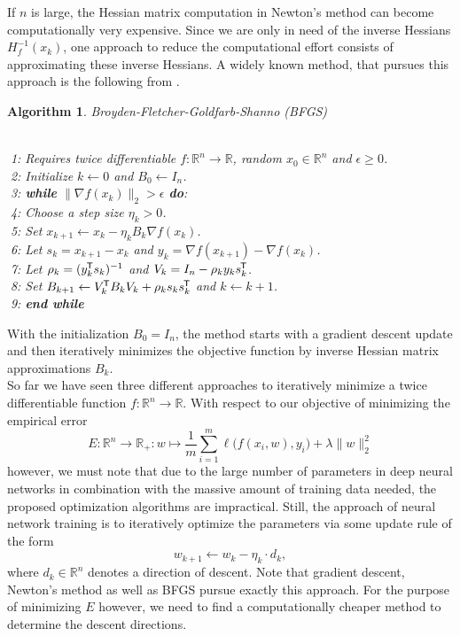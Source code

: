 \documentclass[11pt, a4paper]{article}
\newtheorem{algorithm}[theorem]{Algorithm}
\newcommand{\R}{\mathbb{R}}
\newcommand*{\tr}{^{\mkern-1.5mu\mathsf{T}}}
\begin{document}
If $n$ is large, the Hessian matrix computation in Newton's method can become computationally very expensive. Since we are only in need of the inverse Hessians $H_f^{-1}(x_k)$, one approach to reduce the computational effort consists of approximating these inverse Hessians. A widely known method, that pursues this approach is the following from \cite{BFGS}.

\begin{algorithm}
\caption{Broyden-Fletcher-Goldfarb-Shanno (BFGS) \textcolor{white}{$\Big |$}} \ \\
\textcolor{white}{$\Big |$}1: Requires twice differentiable $f: \R^n \to \R$, random $x_0 \in \R^n$ and  $\epsilon \geq 0$. \\
\textcolor{white}{$\Big |$}2: Initialize $k \leftarrow 0$ and $B_0 \leftarrow I_n$. \\
\textcolor{white}{$\Big |$}3: \textbf{while} $ \big \| \nabla f(x_k) \big \|_2 > \epsilon $ \textbf{do}: \\
\textcolor{white}{$\Big |$}4: \quad Choose a step size $\eta_k > 0$. \\
\textcolor{white}{$\Big |$}5: \quad Set $x_{k+1} \leftarrow x_k - \eta_k B_k \nabla f(x_{k})$. \\
\textcolor{white}{$\Big |$}6: \quad Let $s_k = x_{k+1} - x_{k}$ and $y_k = \nabla f(x_{k+1}) - \nabla f(x_{k})$. \\
\textcolor{white}{$\Big |$}7: \quad Let $\rho_k = (y_k\tr s_k)^{-1}$ and $V_k = I_n - \rho_k y_k s_k\tr $. \\
\textcolor{white}{$\Big |$}8: \quad Set $B_{k+1} \leftarrow V_k\tr B_{k}V_k + \rho_k s_k s_k\tr $ and $k \leftarrow k+1$. \\
\textcolor{white}{$\Big |$}9: \textbf{end while}
\end{algorithm}

With the initialization $B_0 = I_n$, the method starts with a gradient descent update and then iteratively minimizes the objective function by inverse Hessian matrix approximations $B_k$. \\

So far we have seen three different approaches to iteratively minimize a twice differentiable function $f: \R^n \to \R$. With respect to our objective of minimizing the empirical error
\[ E : \R^n \to \R_+ : w \mapsto \frac{1}{m} \sum_{i=1}^{m} \ell \big ( f(x_i,w),y_i \big) + \lambda \big \| w \big \|_2^2 \]
however, we must note that due to the large number of parameters in deep neural networks in combination with the massive amount of training data needed, the proposed optimization algorithms are impractical. Still, the approach of neural network training is to iteratively optimize the parameters via some update rule of the form
\[ w_{k+1} \leftarrow w_k - \eta_k \cdot d_k, \]
where $d_k \in \R^n$ denotes a direction of descent. Note that gradient descent, Newton's method as well as BFGS pursue exactly this approach. For the purpose of minimizing $E$ however, we need to find a computationally cheaper method to determine the descent directions. \\
\end{document}
